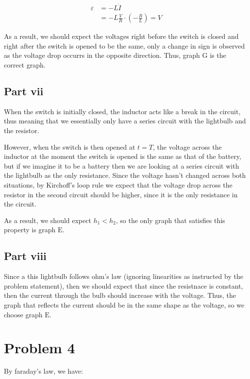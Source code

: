 \documentclass{article}
\theoremstyle{definition}
\numberwithin{equation}{section}
\numberwithin{definition}{section}
\begin{document}
\begin{align*}
\varepsilon &= -L \dot I \\
&= -L \frac{V}{R} \cdot \left(-\frac{R}{L}\right) = V
\end{align*}

As a result, we should expect the voltages right before the switch is closed and right after the switch is opened to be the same, only a change in sign is observed as the voltage drop occurrs in the opposite direction. Thus, graph $\boxed{\text{G}}$ is the correct graph.

\subsection{Part vii}

When the switch is initially closed, the inductor acts like a break in the circuit, thus meaning that we essentially only have a series circuit with the lightbulb and the resistor. 

However, when the switch is then opened at $t = T$, the voltage across the inductor at the moment the switch is opened is the same as that of the battery, but if we imagine it to be a battery then we are looking at a series circuit with the lightbulb as the only resistance. Since the voltage hasn't changed across both situations, by Kirchoff's loop rule we expect that the voltage drop across the resistor in the second circuit should be higher, since it is the only resistance in the circuit.

As a result, we should expect $h_1 < h_2$, so the only graph that satisfies this property is graph $\boxed{\text{E}}$.


\subsection{Part viii}

Since a this lightbulb follows ohm's law (ignoring linearities as instructed by the problem statement), then we should expect that since the resistnace is constant, then the current through the bulb should increase with the voltage. Thus, the graph that reflects the current should be in the same shape as the voltage, so we choose graph $\boxed{\text{E}}$.

\section{Problem 4}

By faraday's law, we have:
\end{document}
